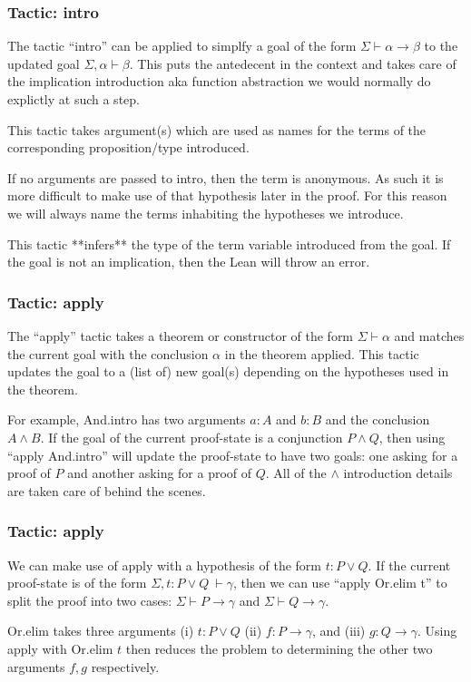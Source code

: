 \documentclass{beamer}
\theoremstyle{indentDefn} \newtheorem{defn}[]{Definition}
\begin{document}
\begin{frame}
	\frametitle{Tactic: intro}
	
	The tactic ``intro'' can be applied to simplfy a goal of the form $\Sigma \vdash \alpha \to \beta$ to the updated goal $\Sigma, \alpha \vdash \beta$. This puts the antedecent in the context and takes care of the implication introduction aka function abstraction we would normally do explictly at such a step. 
	
	This tactic takes argument(s) which are used as names for the terms of the corresponding proposition/type introduced. 
	
	If no arguments are passed to intro, then the term is anonymous. As such it is more difficult to make use of that hypothesis later in the proof. For this reason we will always name the terms inhabiting the hypotheses we introduce.
	
	This tactic **infers** the type of the term variable introduced from the goal. If the goal is not an implication, then the Lean will throw an error.
\end{frame}

\begin{frame}
	\frametitle{Tactic: apply}
	
	The ``apply'' tactic takes a theorem or constructor of the form $\Sigma \vdash \alpha$ and matches the current goal with the conclusion $\alpha$ in the theorem applied. This tactic updates the goal to a (list of) new goal(s) depending on the hypotheses used in the theorem. 
	
	For example, And.intro has two arguments $a : A$ and $b : B$ and the conclusion $A \land B$. If the goal of the current proof-state is a conjunction $P \land Q$, then using ``apply And.intro'' will update the proof-state to have two goals: one asking for a proof of $P$ and another asking for a proof of $Q$. All of the $\land$ introduction details are taken care of behind the scenes.

\end{frame}

\begin{frame}
	\frametitle{Tactic: apply}

	We can make use of apply with a hypothesis of the form $t : P \lor Q$. If the current proof-state is of the form $\Sigma, t : P \lor Q \ \vdash \gamma$, then we can use ``apply Or.elim t'' to split the proof into two cases: $\Sigma \vdash P \to \gamma$ and $\Sigma \vdash Q \to \gamma$.
	
	Or.elim takes three arguments (i) $t : P \lor Q$ (ii) $f : P \to \gamma$, and (iii) $g: Q \to \gamma$. Using apply with Or.elim $t$ then reduces the problem to determining the other two arguments $f, g$ respectively. 

\end{frame}
\end{document}
